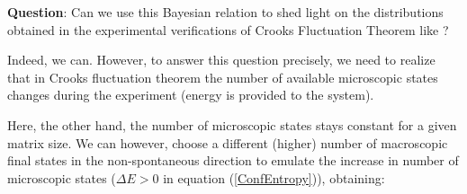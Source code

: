\documentclass[a0]{sciposter}
\begin{document}
\begin{multicols}{3}
\begin{flushleft}
\begin{tcolorbox}[colframe=yellow!500!white,colback=white!50!white,boxrule=3pt]
\textbf{Question}: Can we use this Bayesian relation to shed light on the distributions obtained in the experimental verifications of Crooks Fluctuation Theorem like \cite{Collin:2005fxa}? 
\end{tcolorbox}
\vspace{-0.5cm} 
Indeed, we can. However, to answer this question precisely, we need to realize that in Crooks fluctuation theorem the number of available microscopic states changes during the experiment (energy is provided to the system). 
\vspace{0.5cm} 

Here, the other hand, the number of microscopic states stays constant for a given matrix size. We can however, choose a different (higher) number of macroscopic final states in the non-spontaneous direction to emulate the increase in number of microscopic states ($\Delta E > 0$ in equation (\ref{ConfEntropy})), obtaining:



\end{flushleft}
\end{multicols}
\end{document}
